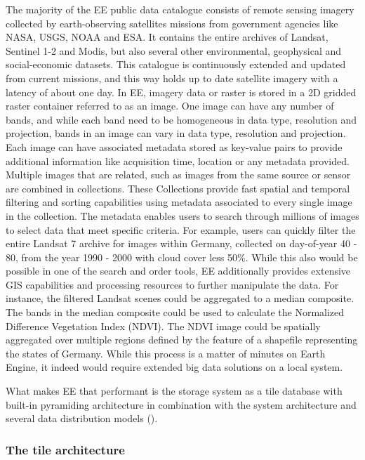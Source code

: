 The majority of the EE public data catalogue consists of remote sensing imagery collected by earth-observing satellites missions from government agencies like NASA, USGS, NOAA and ESA. It contains the entire archives of Landsat, Sentinel 1-2 and Modis, but also several other environmental, geophysical and social-economic datasets. This catalogue is continuously extended and updated from current missions, and this way holds up to date satellite imagery with a latency of about one day.
In EE, imagery data or raster is stored in a 2D gridded raster container referred to as an image. One image can have any number of bands, and while each band need to be homogeneous in data type, resolution and projection, bands in an image can vary in data type, resolution and projection. Each image can have associated metadata stored as key-value pairs to provide additional information like acquisition time, location or any metadata provided.
Multiple images that are related, such as images from the same source or sensor are combined in collections. These Collections provide fast spatial and temporal filtering and sorting capabilities using metadata associated to every single image in the collection. The metadata enables users to search through millions of images to select data that meet specific criteria. For example, users can quickly filter the entire Landsat 7 archive for images within Germany, collected on day-of-year 40 - 80, from the year 1990 - 2000 with cloud cover less 50\%. While this also would be possible in one of the search and order tools, EE additionally provides extensive GIS capabilities and processing resources to further manipulate the data.
For instance, the filtered Landsat scenes could be aggregated to a median composite. The bands in the median composite could be used to calculate the Normalized Difference Vegetation Index (NDVI). The NDVI image could be spatially aggregated over multiple regions defined by the feature of a shapefile representing the states of Germany. While this process is a matter of minutes on Earth Engine, it indeed would require extended big data solutions on a local system.

What makes EE that performant is the storage system as a tile database with built-in pyramiding architecture in combination with the system architecture and several data distribution models (\cite{gorelick2017google}).

\subsubsection{The tile architecture}

